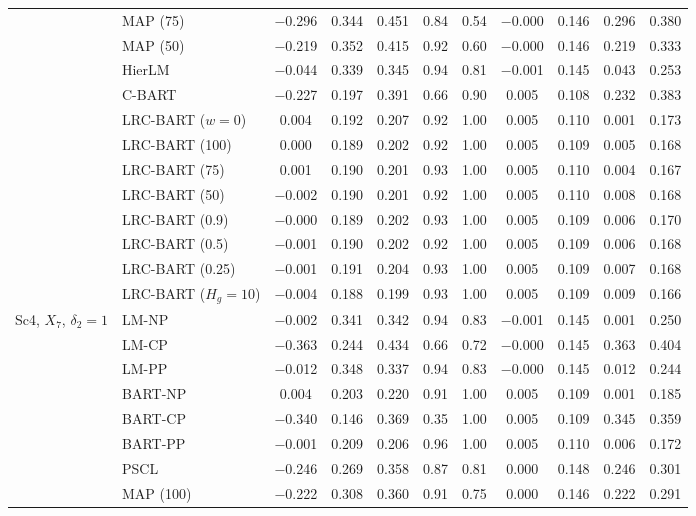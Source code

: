 \begin{center}
\begin{longtable}{llccccccccc}
& MAP (75) & $-$0.296 & 0.344 & 0.451 & 0.84 & 0.54 & $-$0.000 & 0.146 & 0.296 & 0.380 \\
& MAP (50) & $-$0.219 & 0.352 & 0.415 & 0.92 & 0.60 & $-$0.000 & 0.146 & 0.219 & 0.333 \\
& HierLM & $-$0.044 & 0.339 & 0.345 & 0.94 & 0.81 & $-$0.001 & 0.145 & 0.043 & 0.253 \\
& C-BART & $-$0.227 & 0.197 & 0.391 & 0.66 & 0.90 & 0.005 & 0.108 & 0.232 & 0.383 \\
& LRC-BART ($w=0$) & 0.004 & 0.192 & 0.207 & 0.92 & 1.00 & 0.005 & 0.110 & 0.001 & 0.173 \\
& LRC-BART (100) & 0.000 & 0.189 & 0.202 & 0.92 & 1.00 & 0.005 & 0.109 & 0.005 & 0.168 \\
& LRC-BART (75) & 0.001 & 0.190 & 0.201 & 0.93 & 1.00 & 0.005 & 0.110 & 0.004 & 0.167 \\
& LRC-BART (50) & $-$0.002 & 0.190 & 0.201 & 0.92 & 1.00 & 0.005 & 0.110 & 0.008 & 0.168 \\
& LRC-BART (0.9) & $-$0.000 & 0.189 & 0.202 & 0.93 & 1.00 & 0.005 & 0.109 & 0.006 & 0.170 \\
& LRC-BART (0.5) & $-$0.001 & 0.190 & 0.202 & 0.92 & 1.00 & 0.005 & 0.109 & 0.006 & 0.168 \\
& LRC-BART (0.25) & $-$0.001 & 0.191 & 0.204 & 0.93 & 1.00 & 0.005 & 0.109 & 0.007 & 0.168 \\
& LRC-BART ($H_g=10$) & $-$0.004 & 0.188 & 0.199 & 0.93 & 1.00 & 0.005 & 0.109 & 0.009 & 0.166 \\
\midrule
\multirow{20}{*}{Sc4, $X_7$, $\delta_2=1$} & LM-NP & $-$0.002 & 0.341 & 0.342 & 0.94 & 0.83 & $-$0.001 & 0.145 & 0.001 & 0.250 \\
& LM-CP & $-$0.363 & 0.244 & 0.434 & 0.66 & 0.72 & $-$0.000 & 0.145 & 0.363 & 0.404 \\
& LM-PP & $-$0.012 & 0.348 & 0.337 & 0.94 & 0.83 & $-$0.000 & 0.145 & 0.012 & 0.244 \\
& BART-NP & 0.004 & 0.203 & 0.220 & 0.91 & 1.00 & 0.005 & 0.109 & 0.001 & 0.185 \\
& BART-CP & $-$0.340 & 0.146 & 0.369 & 0.35 & 1.00 & 0.005 & 0.109 & 0.345 & 0.359 \\
& BART-PP & $-$0.001 & 0.209 & 0.206 & 0.96 & 1.00 & 0.005 & 0.110 & 0.006 & 0.172 \\
& PSCL & $-$0.246 & 0.269 & 0.358 & 0.87 & 0.81 & 0.000 & 0.148 & 0.246 & 0.301 \\
& MAP (100) & $-$0.222 & 0.308 & 0.360 & 0.91 & 0.75 & 0.000 & 0.146 & 0.222 & 0.291 \\

\end{longtable}
\end{center}
